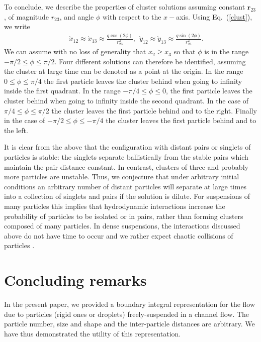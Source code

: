 To conclude, we describe the properties of cluster solutions assuming constant $\bm r_{23}$, of magnitude $r_{23}$, and angle $\phi$ with respect to the $x-$axis. Using Eq.~(\ref{clust}), we write
\begin{eqnarray}&&\!\!\!\!\!\!\!\!\!\!\!\!\!\!\!\!
\dot x_{12}\!\approx \dot x_{13}\approx \frac{q\cos(2\phi)}{r_{23}^2},\ \ \dot y_{12}\!\approx \dot y_{13}\approx \frac{q\sin(2\phi)}{r_{23}^2}. \nonumber
\end{eqnarray}
We can assume with no loss of generality that $x_2\geq x_3$ so that $\phi$ is in the range $-\pi/2\leq\phi\leq \pi/2$.
Four different solutions can therefore be identified, assuming the cluster at large time can be denoted as a point at the origin.
In the range $0\leq \phi\leq \pi/4$ the first particle leaves the cluster behind when going to infinity inside the first quadrant.
%
In the range $-\pi/4\leq \phi\leq 0$, the first particle leaves the cluster behind when going to infinity inside the second quadrant. In the case of $\pi/4\leq \phi\leq  \pi/2$ the cluster leaves the first particle behind and to the right. Finally in the case of $-\pi/2\leq \phi\leq  -\pi/4$ the cluster leaves the first particle behind and to the left.


It is clear from the above that the configuration with distant pairs or singlets of particles is stable: the singlets separate ballistically from the stable pairs which maintain the pair 
distance constant. 
In contrast, clusters of three and probably more particles are unstable.  Thus, we conjecture that under arbitrary initial conditions an arbitrary number of distant particles will 
separate at large times into a collection of singlets and pairs if the solution is dilute. For suspensions of many particles this implies that hydrodynamic interactions increase the 
probability of particles to be isolated or in pairs, rather than forming clusters composed of many particles. In dense suspensions, the interactions discussed above do not have 
time to occur and we rather expect chaotic collisions of particles \citep{tl2014}.

\section{Concluding remarks}

In the present paper, we provided a boundary integral representation for the flow due to particles (rigid ones or droplets) freely-suspended in a channel flow. The particle number, size and shape and the inter-particle distances are arbitrary.
We have thus demonstrated the utility of this representation.

